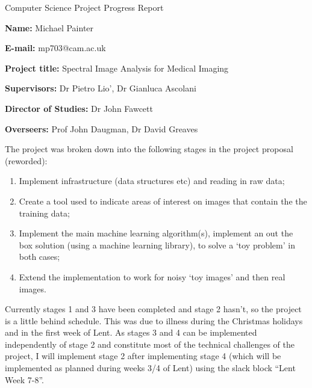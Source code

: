 \documentclass[12pt,a4paper,twoside]{article}
\begin{document}
\vfil

\centerline{\Large Computer Science Project Progress Report}
\vspace{0.4in}

\noindent
{\bf Name:} Michael Painter
\vspace{0.2in}

\noindent
{\bf E-mail:} mp703@cam.ac.uk
\vspace{0.2in}

\noindent
{\bf Project title:} Spectral Image Analysis for Medical Imaging
\vspace{0.2in}

\noindent
{\bf Supervisors:} Dr Pietro Lio', Dr Gianluca Ascolani
\vspace{0.2in}

\noindent
{\bf Director of Studies:} Dr John Fawcett
\vspace{0.2in}

\noindent
{\bf Overseers:} Prof John Daugman, Dr David Greaves
\vspace{0.2in}




The project was broken down into the following stages in the project proposal (reworded):
\begin{enumerate}
    \item 
        Implement infrastructure (data structures etc) and reading in raw data;
    \item 
        Create a tool used to indicate areas of interest on images that contain the the training data;
    \item 
        Implement the main machine learning algorithm(s), implement an out the box solution (using a machine learning 
        library), to solve a `toy problem' in both cases;
    \item 
        Extend the implementation to work for noisy `toy images' and then real images.
\end{enumerate}

Currently stages 1 and 3 have been completed and stage 2 hasn't, so the project is a little behind schedule. This was due to illness during the Christmas holidays and in the first week of Lent. As stages 3 and 4 can be implemented independently of stage 2 and constitute most of the technical challenges of the project, I will implement stage 2 after implementing stage 4 (which will be implemented as planned during weeks 3/4 of Lent) using the slack block ``Lent Week 7-8''. \\
\end{document}
